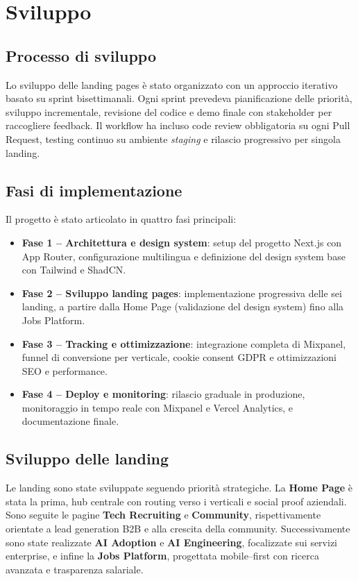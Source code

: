 \chapter{Sviluppo}

\section{Processo di sviluppo}
Lo sviluppo delle landing pages è stato organizzato con un approccio
iterativo basato su sprint bisettimanali. Ogni sprint prevedeva
pianificazione delle priorità, sviluppo incrementale, revisione del
codice e demo finale con stakeholder per raccogliere feedback.  
Il workflow ha incluso code review obbligatoria su ogni Pull Request,
testing continuo su ambiente \textit{staging} e rilascio progressivo
per singola landing.

\section{Fasi di implementazione}
Il progetto è stato articolato in quattro fasi principali:

\begin{itemize}
  \item \textbf{Fase 1 – Architettura e design system}: setup del progetto
  Next.js con App Router, configurazione multilingua e definizione del design
  system base con Tailwind e ShadCN.
  \item \textbf{Fase 2 – Sviluppo landing pages}: implementazione progressiva
  delle sei landing, a partire dalla Home Page (validazione del design system) fino alla Jobs Platform.
  \item \textbf{Fase 3 – Tracking e ottimizzazione}: integrazione completa di
  Mixpanel, funnel di conversione per verticale, cookie consent GDPR e
  ottimizzazioni SEO e performance.
  \item \textbf{Fase 4 – Deploy e monitoring}: rilascio graduale in produzione,
  monitoraggio in tempo reale con Mixpanel e Vercel Analytics, e documentazione finale.
\end{itemize}

\section{Sviluppo delle landing}
Le landing sono state sviluppate seguendo priorità strategiche. La
\textbf{Home Page} è stata la prima, hub centrale con routing verso i verticali
e social proof aziendali.  
Sono seguite le pagine \textbf{Tech Recruiting} e \textbf{Community}, rispettivamente orientate a lead generation B2B e alla crescita della community.  
Successivamente sono state realizzate \textbf{AI Adoption} e \textbf{AI Engineering}, focalizzate sui servizi enterprise, e infine la \textbf{Jobs Platform}, progettata mobile–first con ricerca avanzata e trasparenza salariale.  

